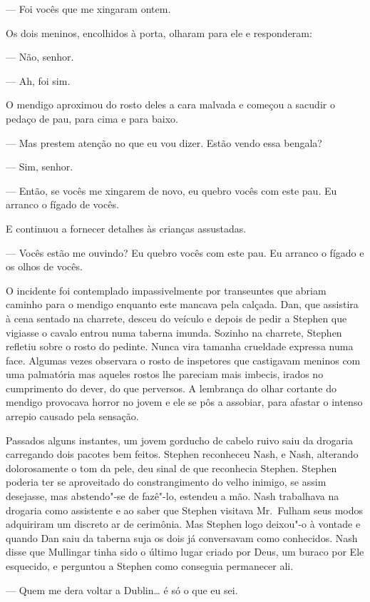 --- Foi vocês que me xingaram ontem.

Os dois meninos, encolhidos à porta, olharam para ele e responderam:

--- Não, senhor.

--- Ah, foi sim.

O mendigo aproximou do rosto deles a cara malvada e começou a
sacudir o pedaço de pau, para cima e para baixo.

--- Mas prestem atenção no que eu vou dizer.  Estão vendo essa
bengala?

--- Sim, senhor.

--- Então, se vocês me xingarem de novo, eu quebro vocês com este
pau.  Eu arranco o fígado de vocês.

E continuou a fornecer detalhes às crianças assustadas.

--- Vocês estão me ouvindo?  Eu quebro vocês com este pau.  Eu
arranco o fígado e os olhos de vocês.

O incidente foi contemplado impassivelmente por transeuntes que
abriam caminho para o mendigo enquanto este mancava pela calçada.  Dan,
que assistira à cena sentado na charrete, desceu do veículo e depois de
pedir a Stephen que vigiasse o cavalo entrou numa taberna imunda. 
Sozinho na charrete, Stephen refletiu sobre o rosto do pedinte.  Nunca
vira tamanha crueldade expressa numa face.  Algumas vezes observara o
rosto de inspetores que castigavam meninos com uma palmatória mas
aqueles rostos lhe pareciam mais imbecis, irados no cumprimento do
dever, do que perversos.  A lembrança do olhar cortante do mendigo
provocava horror no jovem e ele se pôs a assobiar, para afastar o
intenso arrepio causado pela sensação.

Passados alguns instantes, um jovem gorducho de cabelo ruivo saiu da
drogaria carregando dois pacotes bem feitos.  Stephen reconheceu Nash,
e Nash, alterando dolorosamente o tom da pele, deu sinal de que
reconhecia Stephen.  Stephen poderia ter se aproveitado do
constrangimento do velho inimigo, se assim desejasse, mas abstendo"-se
de fazê"-lo, estendeu a mão.  Nash trabalhava na drogaria como
assistente e ao saber que Stephen visitava Mr.~Fulham seus modos
adquiriram um discreto ar de cerimônia.  Mas Stephen logo deixou"-o à
vontade e quando Dan saiu da taberna suja os dois já conversavam como
conhecidos.  Nash disse que Mullingar tinha sido o último lugar criado
por Deus, um buraco por Ele esquecido, e perguntou a Stephen como
conseguia permanecer ali.

--- Quem me dera voltar a Dublin\ldots{} é só o que eu sei.

